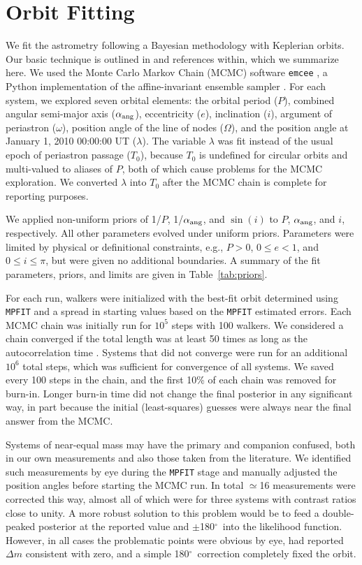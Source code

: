 \documentclass[twocolumn]{aastex62}
\newcommand{\degree}{$^{\circ}$}
\begin{document}
\section{Orbit Fitting}\label{sec:orbit}
We fit the astrometry following a Bayesian methodology with Keplerian orbits. Our basic technique is outlined in \citep{Dupuy2017} and references within, which we summarize here. We used the Monte Carlo Markov Chain (MCMC) software {\tt emcee} \citep{Foreman-Mackey2013}, a Python implementation of the affine-invariant ensemble sampler \citep{goodman2010}. For each system, we explored seven orbital elements: the orbital period ($P$), combined angular semi-major axis ($\alpha_{\rm{ang}}$), eccentricity ($e$), inclination ($i$), argument of periastron ($\omega$), position angle of the line of nodes ($\Omega$), and the position angle at January 1, 2010 00:00:00 UT ($\lambda$). The variable $\lambda$ was fit instead of the usual epoch of periastron passage ($T_0$), because $T_0$ is undefined for circular orbits and multi-valued to aliases of $P$, both of which cause problems for the MCMC exploration. We converted $\lambda$ into $T_0$ after the MCMC chain is complete for reporting purposes. 

We applied non-uniform priors of 1/$P$, 1/$\alpha_{\rm{ang}}$, and $\sin(i)$ to $P$, $\alpha_{\rm{ang}}$, and $i$, respectively. All other parameters evolved under uniform priors. Parameters were limited by physical or definitional constraints, e.g., $P>0$, $0 \le e<1$, and $0\le i \le \pi$, but were given no additional boundaries. A summary of the fit parameters, priors, and limits are given in Table~\ref{tab:priors}. 


For each run, walkers were initialized with the best-fit orbit determined using {\tt MPFIT} \citep{Markwart2009} and a spread in starting values based on the {\tt MPFIT} estimated errors. Each MCMC chain was initially run for $10^5$ steps with 100 walkers. We considered a chain converged if the total length was at least 50 times as long as the autocorrelation time \citep{2010CAMCS...5...65G}. Systems that did not converge were run for an additional $10^6$ total steps, which was sufficient for convergence of all systems. We saved every 100 steps in the chain, and the first 10\% of each chain was removed for burn-in. Longer burn-in time did not change the final posterior in any significant way, in part because the initial (least-squares) guesses were always near the final answer from the MCMC. 

Systems of near-equal mass may have the primary and companion confused, both in our own measurements and also those taken from the literature. We identified such measurements by eye during the {\tt MPFIT} stage and manually adjusted the position angles before starting the MCMC run. In total $\simeq$16 measurements were corrected this way, almost all of which were for three systems with contrast ratios close to unity. A more robust solution to this problem would be to feed a double-peaked posterior at the reported value and $\pm$180\degree\ into the likelihood function. However, in all cases the problematic points were obvious by eye, had reported $\Delta m$ consistent with zero, and a simple 180\degree\ correction completely fixed the orbit. 
\end{document}
